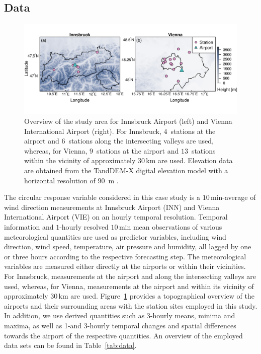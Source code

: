 \documentclass{statsoc}
\begin{document}
\subsection{Data}
\begin{figure}[t]
  \centering
  \includegraphics{_plot_circforest_stationmap_combined.pdf}
  \caption{Overview of the study area for Innsbruck Airport (left) and Vienna International Airport (right). 
    For Innsbruck, $4$~stations at the airport and $6$~stations along the
    intersecting valleys are used, whereas, for Vienna, $9$~stations at the airport
    and $13$~stations within the vicinity of approximately 30\,km are used.
    Elevation data are obtained from the TandDEM-X digital elevation model with a 
    horizontal resolution of $90$~m \citep{Wessel:2018}.}
  \label{fig:overview} 
\end{figure}
\label{sec:wind:data}
The circular response variable considered in this case study is a
$10$\,min-average of wind direction measurements at Innsbruck Airport (INN) and
Vienna International Airport (VIE) on an hourly temporal resolution. Temporal
information and $1$-hourly resolved $10$\,min mean observations of various
meteorological quantities are used as predictor variables, including wind
direction, wind speed, temperature, air pressure and humidity, all lagged by
one or three hours according to the respective forecasting step. The
meteorological variables are measured either directly at the airports or within
their vicinities. For Innsbruck, measurements at the airport and along the
intersecting valleys are used, whereas, for Vienna, measurements at the airport
and within its vicinity of approximately 30\,km are used.
Figure~\ref{fig:overview} provides a topographical overview of the airports and
their surrounding areas with the station sites employed in this study. In
addition, we use derived quantities such as 3-hourly means, minima and maxima,
as well as 1-and 3-hourly temporal changes and spatial differences towards the
airport of the respective quantities. An overview of the employed data sets can
be found in Table~\ref{tab:data}. 
\end{document}
